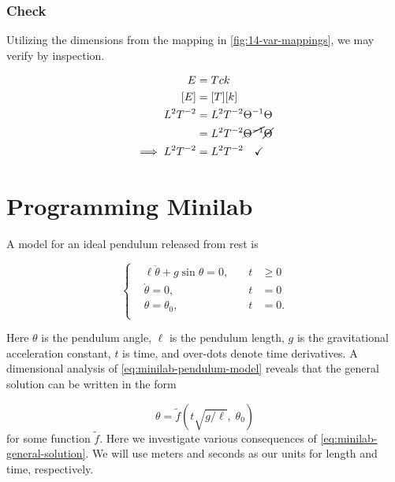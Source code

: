 \documentclass[12pt]{article}
\begin{document}
  \subsubsection*{Check}
  Utilizing the dimensions from the mapping in \cref{fig:14-var-mappings}, we
  may verify by inspection.

  \begin{equation*}
    \begin{aligned}
      E &= Tck \\
      [E] &= [T][k] \\
      L^2T^{-2} &= L^2T^{-2}\Theta^{-1} \Theta \\
       &= L^2T^{-2} \cancel{\Theta^{-1}} \cancel{\Theta} \\
      \implies L^2T^{-2} &= L^2T^{-2} \quad\checkmark \\
    \end{aligned}
  \end{equation*}

\newpage
\section{Programming Minilab}
A model for an ideal pendulum released from rest is

\begin{equation}
  \label{eq:minilab-pendulum-model}
   \left\{
  \begin{aligned}
    &\ell\ddot{\theta}+g\sin\theta = 0, \quad &t &\ge0 \\
    &\dot{\theta} = 0, \quad &t &= 0 \\
    &\theta = \theta_0, \quad &t &= 0. \\
  \end{aligned}\right.
\end{equation}

Here $\theta$ is the pendulum angle, $\ell$ is the pendulum length, $g$ is the
gravitational acceleration constant, $t$ is time, and over-dots denote time
derivatives. A dimensional analysis of \cref{eq:minilab-pendulum-model} reveals
that the general solution can be written in the form

\begin{equation}
  \label{eq:minilab-general-solution}
  \theta = \tilde{f}(t\sqrt{g/\ell}, \;\theta_0)
\end{equation}
for some function $\tilde{f}$. Here we investigate various consequences of
\cref{eq:minilab-general-solution}. We will use meters and seconds as our units
for length and time, respectively.
\end{document}
